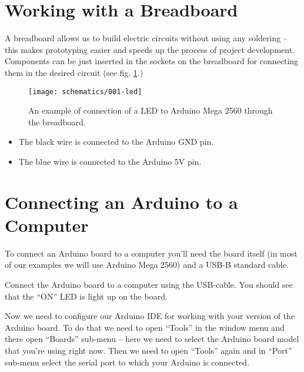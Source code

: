 \documentclass[../sparc.tex]{subfiles}
\begin{document}
\section{Working with a Breadboard}


A breadboard allows us to build electric circuits without using any soldering --
this makes prototyping easier and speeds up the process of project development.
Components can be just inserted in the sockets on the breadboard for connecting
them in the desired circuit (see fig. \ref{fig:breadboard-led}.)

\begin{figure}[ht]
  \centering
  \texttt{[image: schematics/001-led]}
  \caption{An example of connection of a LED to Arduino Mega 2560 through the
    breadboard.}
  \label{fig:breadboard-led}
\end{figure}

\begin{itemize}
\item The black wire is connected to the Arduino GND pin.
\item The blue wire is connected to the Arduino 5V pin.
\end{itemize}


\section{Connecting an Arduino to a Computer}
To connect an Arduino board to a computer you'll need the board itself (in most
of our examples we will use Arduino Mega 2560) and a USB-B standard cable.

Connect the Arduino board to a computer using the USB-cable.  You should see
that the ``ON'' LED is light up on the board.

Now we need to configure our Arduino \gls{IDE} for working with your version of
the Arduino board.  To do that we need to open ``Tools'' in the window menu and
there open ``Boards'' sub-menu -- here we need to select the Arduino board model
that you're using right now.  Then we need to open ``Tools'' again and in
``Port'' sub-menu select the serial port to which your Arduino is connected.
\end{document}
